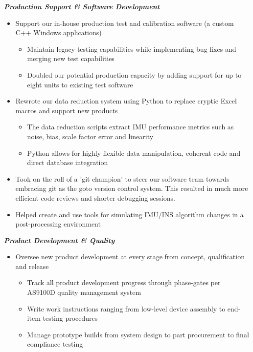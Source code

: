 \documentclass[]{article}
\begin{document}
\begin{singlespace}
\noindent\textbf{\emph{Production Support \& Software Development}}
\vspace{-2mm}
\begin{itemize}
    \setlength\itemsep{0em}
    \item Support our in-house production test and calibration software (a custom C++ Windows applications)
    \vspace{-2mm}
    \begin{itemize}
        \setlength\itemsep{0em}
        \item Maintain legacy testing capabilities while implementing bug fixes and merging new test capabilities
        \item Doubled our potential production capacity by adding support for up to eight units to existing test software
    \end{itemize}

    \vspace{-1mm}
    \item Rewrote our data reduction system using Python to replace cryptic Excel macros and support new products 
    \vspace{-2mm}
    \begin{itemize}
        \setlength\itemsep{0em}
        \item The data reduction scripts extract IMU performance metrics such as noise, bias, scale factor error and linearity
        \item Python allows for highly flexible data manipulation, coherent code and direct database integration
    \end{itemize}
    \vspace{-1mm}

    \item Took on the roll of a 'git champion' to steer our software team towards embracing git as the goto version control system. This resulted in much more efficient code reviews and shorter debugging sessions.
    \item Helped create and use tools for simulating IMU/INS algorithm changes in a post-processing environment

\end{itemize}

\noindent\textbf{\emph{Product Development \& Quality}}
\vspace{-2mm}
\begin{itemize}
    \setlength\itemsep{0em}
    \item Oversee new product development at every stage from concept, qualification and release
    \vspace{-2mm}
    \begin{itemize}
        \setlength\itemsep{0em}
        \item Track all product development progress through phase-gates per AS9100D quality management system
        \item Write work instructions ranging from low-level device assembly to end-item testing procedures
        \item Manage prototype builds from system design to part procurement to final compliance testing 
    \end{itemize}


\end{itemize}
\end{singlespace}
\end{document}
